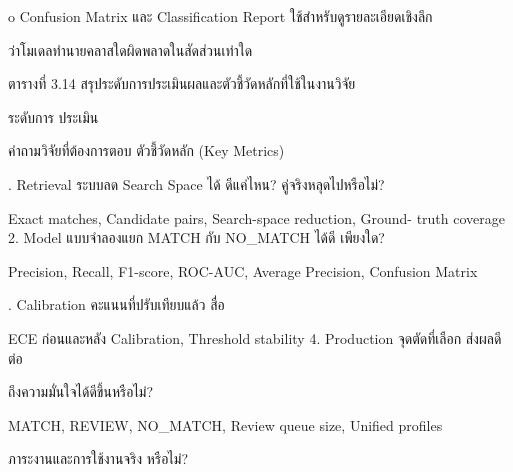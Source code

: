 \documentclass[12pt,a4paper]{report}
\begin{document}
o Confusion Matrix และ Classification Report ใช้สำหรับดูรายละเอียดเชิงลึก\par
ว่าโมเดลทำนายคลาสใดผิดพลาดในสัดส่วนเท่าใด\par
\begin{center}\small ตารางที่ 3.14 สรุประดับการประเมินผลและตัวชี้วัดหลักที่ใช้ในงานวิจัย\end{center}
ระดับการ ประเมิน\par
คำถามวิจัยที่ต้องการตอบ ตัวชี้วัดหลัก (Key Metrics)\par
{}. Retrieval ระบบลด Search Space ได้ ดีแค่ไหน? คู่จริงหลุดไปหรือไม่?\par
Exact matches, Candidate pairs, Search-space reduction, Ground- truth coverage 2. Model แบบจำลองแยก MATCH กับ NO\_MATCH ได้ดี เพียงใด?\par
Precision, Recall, F1-score, ROC-AUC, Average Precision, Confusion Matrix\par
{}. Calibration คะแนนที่ปรับเทียบแล้ว สื่อ\par
ECE ก่อนและหลัง Calibration, Threshold stability 4. Production จุดตัดที่เลือก ส่งผลดีต่อ\par
ถึงความมั่นใจได้ดีขึ้นหรือไม่?\par
MATCH, REVIEW, NO\_MATCH, Review queue size, Unified profiles\par
ภาระงานและการใช้งานจริง หรือไม่?\par
\end{document}
